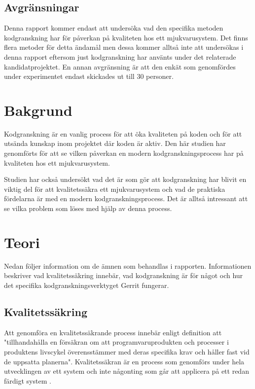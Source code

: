 \subsection{Avgränsningar}
Denna rapport kommer endast att undersöka vad den specifika metoden kodgranskning har för påverkan på kvaliteten hos ett mjukvarusystem. Det finns flera metoder för detta ändamål men dessa kommer alltså inte att undersökas i denna rapport eftersom just kodgranskning har använts under det relaterade kandidatprojektet. En annan avgränsning är att den enkät som genomfördes under experimentet endast skickades ut till 30 personer.

\section{Bakgrund}
\label{sec:background-wallstrom}

Kodgranskning är en vanlig process för att öka kvaliteten på koden och för att utsända kunskap inom projektet där koden är aktiv. Den här studien har genomförts för att se vilken påverkan en modern kodgranskningsprocess har på kvaliteten hos ett mjukvarusystem. 

Studien har också undersökt vad det är som gör att kodgranskning har blivit en viktig del för att kvalitetssäkra ett mjukvarusystem och vad de praktiska fördelarna är med en modern kodgranskningsprocess. Det är alltså intressant att se vilka problem som löses med hjälp av denna process. 

\section{Teori}
\label{sec:theory-wallstrom}
Nedan följer information om de ämnen som behandlas i rapporten. Informationen beskriver vad kvalitetssäkring innebär, vad kodgranskning är för något och hur det specifika kodgranskningsverktyget Gerrit fungerar.

\subsection{Kvalitetssäkring}
Att genomföra en kvalitetssäkrande process innebär enligt definition att "tillhandahålla en försäkran om att programvaruprodukten och processer i produktens livscykel överensstämmer med deras specifika krav och håller fast vid de uppsatta planerna". 
Kvalitetssäkran är en process som genomförs under hela utvecklingen av ett system och inte någonting som går att applicera på ett redan färdigt system \cite{feldman2005quality}.

